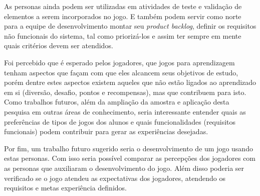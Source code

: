 As personas ainda podem ser utilizadas em atividades de teste e validação de elementos a serem incorporados no jogo. E também podem servir como norte para a equipe de desenvolvimento montar seu \textit{product backlog}, definir os requisitos não funcionais do sistema, tal como priorizá-los e assim ter sempre em mente quais critérios devem ser atendidos.

Foi percebido que é esperado pelos jogadores, que jogos para aprendizagem tenham aspectos que façam com que eles alcancem seus objetivos de estudo, porém dentre estes aspectos existem aqueles que não estão ligados ao aprendizado em si (diversão, desafio, pontos e recompensas), mas que contribuem para isto. Como trabalhos futuros, além da ampliação da amostra e aplicação desta pesquisa em outras áreas de conhecimento, seria interessante entender quais as preferências de tipos de jogos dos alunos e quais funcionalidades (requisitos funcionais) podem contribuir para gerar as experiências desejadas. 

Por fim, um trabalho futuro sugerido seria o desenvolvimento de um jogo usando estas personas. Com isso seria possível comparar as percepções dos jogadores com as personas que auxiliaram o desenvolvimento do jogo. Além disso poderia ser verificado se o jogo atendeu as expectativas dos jogadores, atendendo os requisitos e metas experiência definidos. 
